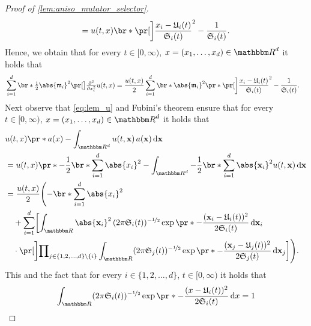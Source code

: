 \begin{proof}[Proof of \cref{lem:aniso_mutator_selector}]
\begin{equation}
\begin{split}
			= 
			u(t,x) \br*{ \bbbpr{\frac{x_i - \mathfrak{U}_i(t)}{\mathfrak{S}_i(t)}}^{2} - \frac{1}{\mathfrak{S}_i(t)} }
			.
		\end{split}
		\end{equation}
		Hence, 
	we obtain that 
		for every
			$t \in [0,\infty)$,
			$x = (x_1, \dots,x_d)\in \R^d$
		it holds that 
		\begin{equation}\label{lem:derivatives2}
		\begin{split}
			&
			\sum_{i=1}^d \br*{ \tfrac{1}{2} \abs{\mathfrak{m}_i}^2\bpr{\tfrac{\partial^2 }{\partial x_i^2} u} (t,x) } 
			= 
			\frac{u(t,x)}{2}  \sum_{i=1}^d \br*{ \abs{\mathfrak{m}_i}^2 \pr*{ \bbbpr{\frac{x_i - \mathfrak{U}_i(t)}{\mathfrak{S}_i(t)}}^{2} - \frac{1}{\mathfrak{S}_i(t)} }}
			.
		\end{split}
		\end{equation}
	Next observe that 
		\eqref{eq:lem_u} 
		and Fubini's theorem
	ensure that for every
		$t \in [0,\infty)$,
		$x = (x_1, \dots,x_d)\in \R^d$
	it holds that
	\begin{equation}
	\begin{split}
		&u(t,x)\pr*{ a(x) - \int_{\R^d} u(t,\mathbf{x})\, a(\mathbf{x}) \, \diff\mathbf{x} } 
		\\ &= u(t,x) \pr*{ - \frac{1}{2} \br*{\sum_{i=1}^d \abs{x_i}^2 } - \int_{\R^d} - \frac{1}{2} \br*{ \sum_{i=1}^d \abs{\mathbf{x}_i}^2 } u(t,\mathbf{x}) \, \diff \mathbf{x} }
		\\ &= \frac{u(t,x)}{2} \Biggl( - \br*{\sum_{i=1}^d \abs{x_i}^2 } \\
		&\quad + \sum_{i=1}^d \biggl[ \int_\R \abs{\mathbf{x}_i}^2 \, (2\pi    \mathfrak{S}_i(t))^{-\nicefrac{1}{2}}    \exp\pr*{ - \frac{(\mathbf{x}_i -\mathfrak{U}_i(t) )^2}{2\mathfrak{S}_i(t)}}\, \diff\mathbf{x}_i  \\
		&\quad \cdot \bbbpr{\prod\nolimits_{ j \in \{ 1,2, \dots,d \} \backslash\{i\}} \int_\R (2\pi    \mathfrak{S}_j(t))^{-\nicefrac{1}{2}}    \exp\pr*{ - \frac{(\mathbf{x}_j -\mathfrak{U}_j(t) )^2}{2\mathfrak{S}_j(t)}}\, \diff{\mathbf x_j} } \biggr] \Biggr)
		.
	\end{split}
	\end{equation}
		This 
		and the fact that
			for every
				$i \in \{1,2, \dots, d\}$,
				$t \in [0,\infty)$
			it holds that
			\begin{equation}
				\int_\R (2\pi    \mathfrak{S}_i(t))^{-\nicefrac{1}{2}}    \exp\pr*{ - \frac{( x -\mathfrak{U}_i(t) )^2}{2\mathfrak{S}_i(t)}}\, \diff x 
				=
				1
			\end{equation}

\end{proof}
